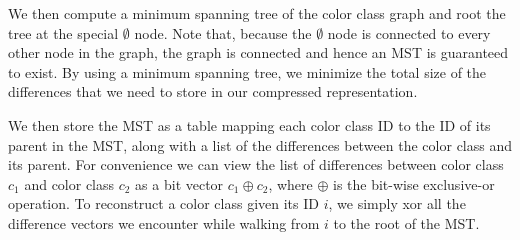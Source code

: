 We then compute a minimum spanning tree of the color class graph and
root the tree at the special $\emptyset$ node.  Note that, because the $\emptyset$
node is connected to every other node in the graph, the graph is
connected and hence an MST is guaranteed to exist.  By using a minimum
spanning tree, we minimize the total size of the differences that
we need to store in our compressed representation.

We then store the MST as a table mapping each color class ID to the ID
of its parent in the MST, along with a list of the differences between
the color class and its parent.  For convenience we can view the list
of differences between color class $c_1$ and color class $c_2$ as a
bit vector $c_1 \oplus c_2$, where $\oplus$ is the bit-wise
exclusive-or operation.  To reconstruct a color class given its ID $i$,
we simply xor all the difference vectors we encounter while walking
from $i$ to the root of the MST.

